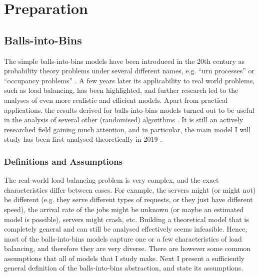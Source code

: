 \chapter{Preparation}\label{preparation}

\ifpdf
    \graphicspath{{Chapter2/Figs/Raster/}{Chapter2/Figs/PDF/}{Chapter2/Figs/}}
\else
    \graphicspath{{Chapter2/Figs/Vector/}{Chapter2/Figs/}}
\fi



\section{Balls-into-Bins}


The simple balls-into-bins models have been introduced in the 20th century as probability theory problems under several different names, e.g. ``urn processes'' or ``occupancy problems'' \cite{kolchin1978coined}. A few years later its applicability to real world problems, such as load balancing, has been highlighted, and further research led to the analyses of even more realistic and efficient models. Apart from practical applications, the results derived for balls-into-bins models turned out to be useful in the analysis of several other (randomised) algorithms \cite{edmonds2006cakecutting}. It is still an actively researched field gaining much attention, and in particular, the main model I will study has been first analysed theoretically in 2019 \cite{dwivedi2019firstthinning}.


\subsection{Definitions and Assumptions}



The real-world load balancing problem is very complex, and the exact characteristics differ between cases. For example, the servers might (or might not) be different (e.g. they serve different types of requests, or they just have different speed), the arrival rate of the jobs might be unknown (or maybe an estimated model is possible), servers might crash, etc. Building a theoretical model that is completely general and can still be analysed effectively seems infeasible. Hence, most of the balls-into-bins models capture one or a few characteristics of load balancing, and therefore they are very diverse. There are however some common assumptions that all of models that I study make. Next I present a sufficiently general definition of the balls-into-bins abstraction, and state its assumptions. 

